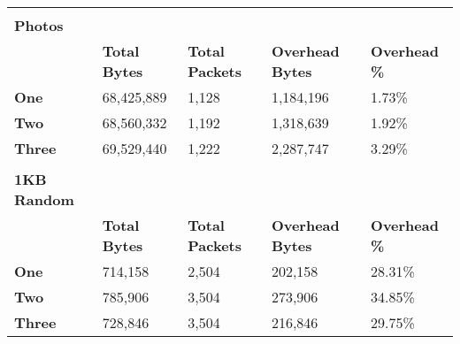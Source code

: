 \begin{table}[h!]
\begin{tabular}{l l l l l}
		\hline
		                    &                      &                        &                         &                      \\
		\textbf{Photos}     &                      &                        &                         &                      \\
		\textbf{}           & \textbf{Total Bytes} & \textbf{Total Packets} & \textbf{Overhead Bytes} & \textbf{Overhead \%} \\
		\hline
		\textbf{One}        & 68,425,889           & 1,128                  & 1,184,196               & 1.73\%               \\
		\hline
		\textbf{Two}        & 68,560,332           & 1,192                  & 1,318,639               & 1.92\%               \\
		\hline
		\textbf{Three}      & 69,529,440           & 1,222                  & 2,287,747               & 3.29\%               \\
		\hline
		                    &                      &                        &                         &                      \\
		\textbf{1KB Random} &                      &                        &                         &                      \\
		\textbf{}           & \textbf{Total Bytes} & \textbf{Total Packets} & \textbf{Overhead Bytes} & \textbf{Overhead \%} \\
		\hline
		\textbf{One}        & 714,158              & 2,504                  & 202,158                 & 28.31\%              \\
		\hline
		\textbf{Two}        & 785,906              & 3,504                  & 273,906                 & 34.85\%              \\
		\hline
		\textbf{Three}      & 728,846              & 3,504                  & 216,846                 & 29.75\%              \\
		\hline
	\end{tabular}
\end{table}
